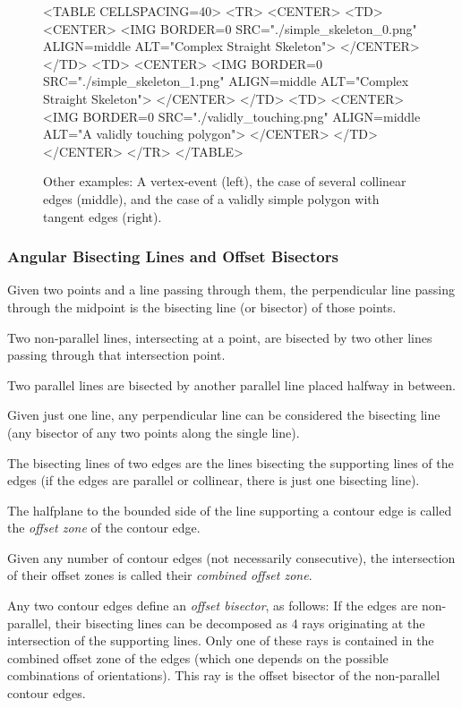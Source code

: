 \begin{figure}[htbp]
\begin{ccHtmlOnly}
<TABLE CELLSPACING=40>
<TR>
<CENTER>
<TD>
<CENTER>
<IMG BORDER=0 SRC="./simple_skeleton_0.png" ALIGN=middle ALT="Complex Straight Skeleton">
</CENTER>
</TD>
<TD>
<CENTER>
<IMG BORDER=0 SRC="./simple_skeleton_1.png" ALIGN=middle ALT="Complex Straight Skeleton">
</CENTER>
</TD>
<TD>
<CENTER>
<IMG BORDER=0 SRC="./validly_touching.png" ALIGN=middle ALT="A validly touching polygon">
</CENTER>
</TD>
</CENTER>
</TR>
</TABLE>
\end{ccHtmlOnly}

\caption{Other examples: A vertex-event (left), the case of several collinear edges (middle), and the case of a validly simple polygon with tangent edges (right).
\label{MoreSLS}}
\end{figure}
  
\subsubsection{Angular Bisecting Lines and Offset Bisectors}  

Given two points and a line passing through them, the perpendicular line passing through the midpoint is the bisecting line (or bisector) of those points.

Two non-parallel lines, intersecting at a point, are bisected by two
other lines passing through that intersection point.

Two parallel lines are bisected by another parallel line placed
halfway in between.

Given just one line, any perpendicular line can be considered the
bisecting line (any bisector of any two points along the single line).

The bisecting lines of two edges are the lines bisecting the
supporting lines of the edges (if the edges are parallel or collinear,
there is just one bisecting line).

The halfplane to the bounded side of the line supporting a contour edge is
called the {\em offset zone} of the contour edge.

Given any number of contour edges (not necessarily consecutive), the
intersection of their offset zones is called their {\em combined
offset zone}.

Any two contour edges define an {\em offset bisector}, as follows: If
the edges are non-parallel, their bisecting lines can be decomposed as
4 rays originating at the intersection of the supporting lines. Only
one of these rays is contained in the combined offset zone of the
edges (which one depends on the possible combinations of
orientations). This ray is the offset bisector of the non-parallel
contour edges.

